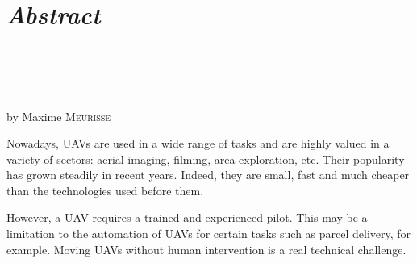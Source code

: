\chapter*{\centering \textit{Abstract}}

\begin{minipage}[t][0.25\textheight]{\textwidth}
    \begin{center}
        \makeatletter

        {\scshape\Large\@institute}\vspace{1.5em}\\
        {\large\@faculty}\vspace{0.5em}\\
        \@department\vspace{1.5em}\\

        {\bfseries \@title}\vspace{1em}\\
        by Maxime \textsc{Meurisse}

        \makeatother
    \end{center}
\end{minipage}

Nowadays, UAVs are used in a wide range of tasks and are highly valued in a variety of sectors: aerial imaging, filming, area exploration, etc. Their popularity has grown steadily in recent years. Indeed, they are small, fast and much cheaper than the technologies used before them.

However, a UAV requires a trained and experienced pilot. This may be a limitation to the automation of UAVs for certain tasks such as parcel delivery, for example. Moving UAVs without human intervention is a real technical challenge.

\thispagestyle{empty}
